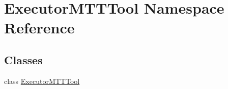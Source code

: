 \hypertarget{namespaceExecutorMTTTool}{\section{Executor\-M\-T\-T\-Tool Namespace Reference}
\label{namespaceExecutorMTTTool}
}
\subsection*{Classes}
\begin{DoxyCompactItemize}
\item 
class \hyperlink{classExecutorMTTTool_1_1ExecutorMTTTool}{Executor\-M\-T\-T\-Tool}
\end{DoxyCompactItemize}

